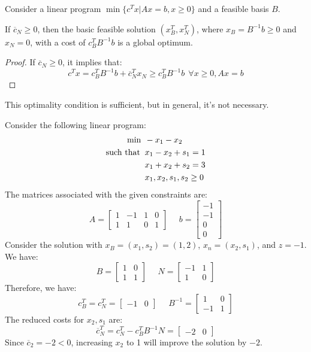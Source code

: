 Consider a linear program $\min\{c^Tx|Ax=b,x\geq 0\}$ and a feasible basis $B$. 
\begin{proposition}
    If $\overline{c}_N \geq 0$, then the basic feasible solution $(x_B^T,x_N^T)$, where $x_B=B^{-1}b \geq 0$ and $x_N = 0$, with a cost of  $c_B^TB^{-1}b$ is a global optimum. 
\end{proposition}
\begin{proof}
    If $\overline{c}_N \geq 0$, it implies that: 
    \[c^Tx=c_B^TB^{-1}b+\overline{c}_N^Tx_N \geq c_B^TB^{-1}b \:\: \forall x \geq 0, Ax=b\]
\end{proof}
This optimality condition is sufficient, but in general, it's not necessary.
\begin{example}
    Consider the following linear program: 
    \begin{align*}
        \min                      \:&\: -x_1-x_2          \\
        \textnormal{such that }     &\: x_1-x_2+s_1=1  \\
                                    &\: x_1+x_2+s_2=3  \\
                                    &\: x_1,x_2,s_1,s_2 \geq 0
    \end{align*}
    The matrices associated with the given constraints are:
    \[
    A=
    \begin{bmatrix}
        1 & -1 & 1 & 0  \\
        1 & 1 & 0 & 1 
    \end{bmatrix}
    \:\:\:\:\:\:
    b=
    \begin{bmatrix}
        -1 \\
        -1 \\
        0  \\
        0
    \end{bmatrix}
    \]
    Consider the solution with $x_B=(x_1,s_2)=(1,2)$, $x_n=(x_2,s_1)$, and $z=-1$. 
    We have:
    \[
    B=
    \begin{bmatrix}
        1 & 0  \\
        1 & 1  
    \end{bmatrix}
    \:\:\:\:\:\:
    N=
    \begin{bmatrix}
        -1 & 1  \\
        1  & 0  
    \end{bmatrix}
    \]
    Therefore, we have:
    \[c_B^T=c_N^T=\begin{bmatrix} -1 & 0 \end{bmatrix} \:\:\:\:\:\: B^{-1}=
    \begin{bmatrix}
        1  & 0  \\
        -1 & 1  
    \end{bmatrix}
    \]
    The reduced costs for $x_2,s_1$ are: 
    \[\overline{c}_N^T=c_N^T-c_B^TB^{-1}N=\begin{bmatrix} -2 & 0 \end{bmatrix}\]
    Since $\overline{c}_2=-2<0$, increasing $x_2$ to 1 will improve the solution by $-2$. 
\end{example}

